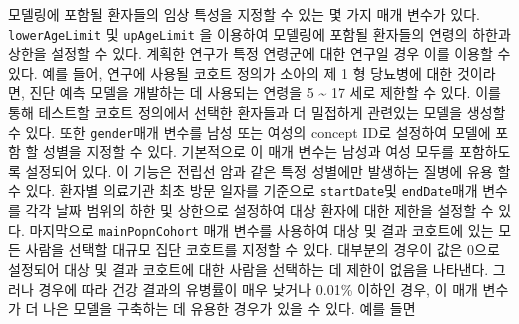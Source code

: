 \documentclass[11pt]{book}
\theoremstyle{definition}
\theoremstyle{definition}
\theoremstyle{definition}
\theoremstyle{remark}
\begin{document}
모델링에 포함될 환자들의 임상 특성을 지정할 수 있는 몇 가지 매개 변수가
있다. \texttt{lowerAgeLimit} 및 \texttt{upAgeLimit} 을 이용하여 모델링에
포함될 환자들의 연령의 하한과 상한을 설정할 수 있다. 계획한 연구가 특정
연령군에 대한 연구일 경우 이를 이용할 수 있다. 예를 들어, 연구에 사용될
코호트 정의가 소아의 제 1 형 당뇨병에 대한 것이라면, 진단 예측 모델을
개발하는 데 사용되는 연령을 5 \textasciitilde{} 17 세로 제한할 수 있다.
이를 통해 테스트할 코호트 정의에서 선택한 환자들과 더 밀접하게 관련있는
모델을 생성할 수 있다. 또한 \texttt{gender}매개 변수를 남성 또는 여성의
concept ID로 설정하여 모델에 포함 할 성별을 지정할 수 있다. 기본적으로
이 매개 변수는 남성과 여성 모두를 포함하도록 설정되어 있다. 이 기능은
전립선 암과 같은 특정 성별에만 발생하는 질병에 유용 할 수 있다. 환자별
의료기관 최초 방문 일자를 기준으로 \texttt{startDate}및
\texttt{endDate}매개 변수를 각각 날짜 범위의 하한 및 상한으로 설정하여
대상 환자에 대한 제한을 설정할 수 있다. 마지막으로
\texttt{mainPopnCohort} 매개 변수를 사용하여 대상 및 결과 코호트에 있는
모든 사람을 선택할 대규모 집단 코호트를 지정할 수 있다. 대부분의 경우이
값은 0으로 설정되어 대상 및 결과 코호트에 대한 사람을 선택하는 데 제한이
없음을 나타낸다. 그러나 경우에 따라 건강 결과의 유병률이 매우 낮거나
0.01\% 이하인 경우, 이 매개 변수가 더 나은 모델을 구축하는 데 유용한
경우가 있을 수 있다. 예를 들면
\end{document}
